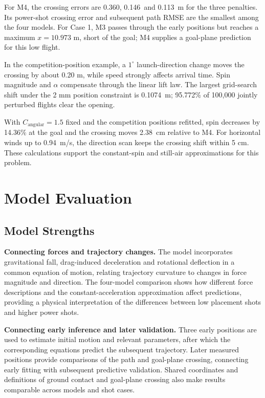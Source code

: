 \documentclass[12pt,letterpaper]{article}
\newcommand{\WMXMFourGoalError}{0.360}
\newcommand{\WOHMFourGoalError}{0.113}
\newcommand{\WRMFourGoalError}{0.146}
\newcommand{\WMXMThreeMaxX}{10.973}
\newcommand{\ChSixSpinLoss}{14.36}
\newcommand{\ChSixGoalShiftCM}{2.38}
\newcommand{\ChSixWindBound}{0.94}
\newcommand{\SensitivityConditionalShift}{0.1074}
\newcommand{\MCClearPercent}{95.772}
\begin{document}
For M4, the crossing errors are \WMXMFourGoalError, \WRMFourGoalError\ and \WOHMFourGoalError\ m for the three penalties. Its power-shot crossing error and subsequent path RMSE are the smallest among the four models. For Case 1, M3 passes through the early positions but reaches a maximum $x=\WMXMThreeMaxX$ m, short of the goal; M4 supplies a goal-plane prediction for this low flight.

In the competition-position example, a $1^\circ$ launch-direction change moves the crossing by about 0.20 m, while speed strongly affects arrival time. Spin magnitude and $\alpha$ compensate through the linear lift law. The largest grid-search shift under the 2 mm position constraint is \SensitivityConditionalShift\ m; \MCClearPercent\% of 100,000 jointly perturbed flights clear the opening.

With $C_{\mathrm{angular}}=1.5$ fixed and the competition positions refitted, spin decreases by \ChSixSpinLoss\% at the goal and the crossing moves \ChSixGoalShiftCM\ cm relative to M4. For horizontal winds up to \ChSixWindBound\ m/s, the direction scan keeps the crossing shift within 5 cm. These calculations support the constant-spin and still-air approximations for this problem.

\section{Model Evaluation}

\subsection{Model Strengths}

\noindent\hspace*{\parindent}\textbf{Connecting forces and trajectory changes.} The model incorporates gravitational fall, drag-induced deceleration and rotational deflection in a common equation of motion, relating trajectory curvature to changes in force magnitude and direction. The four-model comparison shows how different force descriptions and the constant-acceleration approximation affect predictions, providing a physical interpretation of the differences between low placement shots and higher power shots.

\textbf{Connecting early inference and later validation.} Three early positions are used to estimate initial motion and relevant parameters, after which the corresponding equations predict the subsequent trajectory. Later measured positions provide comparisons of the path and goal-plane crossing, connecting early fitting with subsequent predictive validation. Shared coordinates and definitions of ground contact and goal-plane crossing also make results comparable across models and shot cases.
\end{document}
